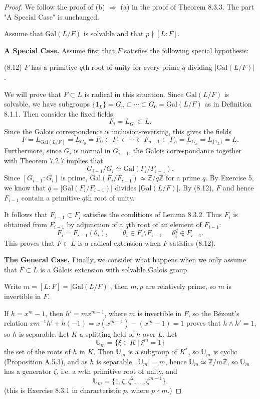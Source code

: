\documentclass[11pt,a4paper]{article}
\newcommand{\Z}{\mathbb{Z}}
\newcommand{\U}{\mathbb{U}}
\newcommand{\Gal}{\mathrm{Gal}}
\begin{document}
\begin{proof}
We follow the proof of (b) $\Rightarrow$ (a) in the proof of Theorem 8.3.3. The part "A Special Case" is unchanged.

Assume that $\Gal(L/F)$ is solvable and that $p \nmid [L:F]$.

{\bf A Special Case.}
 Assume first that $F$ satisfies the following special hypothesis:
\begin{center}
(8.12) $F$ has a primitive $q$th root of unity for every prime $q$ dividing $|\Gal(L/F)|$.
\end{center}

We will prove that $F \subset L$ is radical in this situation. Since $\Gal(L/F)$ is solvable, we have subgroups $\{1_L\} = G_n \subset \cdots \subset G_0 = \Gal(L/F)$ as in Definition 8.1.1. Then consider the fixed fields
$$F_i = L_{G_i} \subset L.$$
Since the Galois correspondence is inclusion-reversing, this gives the fields
$$F=L_{\Gal(L/F)} = L_{G_0}=F_0\subset F_1\subset \cdots \subset F_{n-1} \subset F_n = L_{G_n} = L_{\{1_L\}} = L.$$
Furthermore, since $G_i$ is normal in $G_{i-1}$, the Galois correspondance together with Theorem 7.2.7 implies that
$$G_{i-1}/G_i \simeq \Gal(F_i/F_{i-1}).$$
Since $[G_{i-1}:G_i]$ is prime, $\Gal(F_i/F_{i-1}) \simeq \Z/q\Z$ for a prime $q$. By Exercise 5, we know that $q = |\Gal(F_i/F_{i-1})|$ divides $|\Gal(L/F)|$. By (8.12), $F$ and hence $F_{i-1}$ contain a primitive $q$th root of unity.

It follows that $F_{i-1} \subset F_i$ satisfies the conditions of Lemma 8.3.2. Thus $F_i$ is obtained from $F_{i-1}$ by adjunction of a $q$th root of an element of $F_{i-1}$:
$$F_{i} = F_{i-1}(\theta_i),\qquad \theta_i \in F_i \setminus F_{i-1}, \quad \theta_i^q \in F_{i-1}.$$
This proves that $F\subset L$ is a radical extension when $F$ satisfies (8.12).

\bigskip

{\bf The General Case.} Finally, we consider what happens when we only assume that $F\subset L$ is a Galois extension with solvable Galois group. 

Write $m =  [L:F] = |\Gal(L/F)|$, then $m,p$ are relatively prime, so $m$ is invertible in $F$.

If $h = x^m-1$, then $h' = m x^{m-1}$, where $m$ is invertible in $F$, so the B\'ezout's relation
$xm^{-1} h' + h(-1)= x(x^{m-1}) -(x^m-1) =1$ proves that $h\wedge h'=1$, so $h$ is separable. Let $K$ a splitting field of $h$ over $L$. Let 
$$\U_m = \{\xi \in K\ \vert \ \xi^m = 1\}$$
the set of the roots of $h$ in $K$. Then $\U_m$ is a subgroup of $K^*$, so $\U_m$ is cyclic (Proposition A.5.3), and as $h$ is separable, $| \U_m | = m$, hence $\U_m \simeq \Z/m\Z$, so $\U_m$ has a generator $\zeta$, i.e. a $m$th primitive root of unity, and
$$\U_m = \{1,\zeta, \zeta^2,\ldots, \zeta^{m-1}\}.$$
(this is Exercise 8.3.1 in characteristic $p$, where $p\nmid m$.)


\end{proof}
\end{document}
